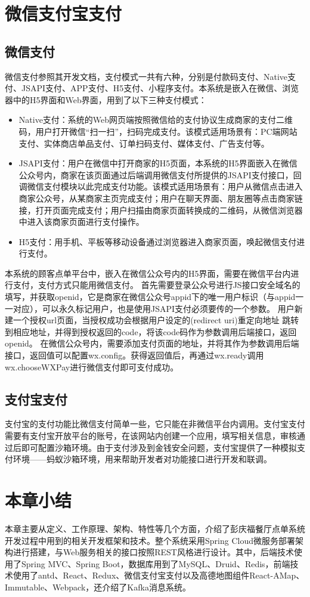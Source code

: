 \section{微信支付宝支付}
\subsection{微信支付}
微信支付参照其开发文档，支付模式一共有六种，分别是付款码支付、Native支付、JSAPI支付、APP支付、H5支付、小程序支付。本系统是嵌入在微信、浏览器中的H5界面和Web界面，用到了以下三种支付模式：
\begin{itemize}
    \item Native支付：系统的Web网页端按照微信给的支付协议生成商家的支付二维码，用户打开微信“扫一扫”，扫码完成支付。该模式适用场景有：PC端网站支付、实体商店单品支付、订单扫码支付、媒体支付、广告支付等。
    \item JSAPI支付：用户在微信中打开商家的H5页面，本系统的H5界面嵌入在微信公众号内，商家在该页面通过后端调用微信支付所提供的JSAPI支付接口，回调微信支付模块以此完成支付功能。该模式适用场景有：用户从微信点击进入商家公众号，从某商家主页完成支付；用户在聊天界面、朋友圈等点击商家链接，打开页面完成支付；用户扫描由商家页面转换成的二维码，从微信浏览器中进入该商家页面进行支付操作。
    \item 	H5支付：用手机、平板等移动设备通过浏览器进入商家页面，唤起微信支付进行支付。
\end{itemize}

本系统的顾客点单平台中，嵌入在微信公众号内的H5界面，需要在微信平台内进行支付，支付方式只能用微信支付。
首先需要登录公众号进行JS接口安全域名的填写，并获取openid，它是商家在微信公众号appid下的唯一用户标识（与appid一一对应），可以永久标记用户，也是使用JSAPI支付必须要传的一个参数。
用户新建一个授权url页面，当授权成功会根据用户设定的(redirect uri)重定向地址
跳转到相应地址，并得到授权返回的code，将该code码作为参数调用后端接口，返回openid。
在微信公众号内，需要添加支付页面的地址，并将其作为参数调用后端接口，返回值可以配置wx.config。获得返回值后，再通过wx.ready调用wx.chooseWXPay进行微信支付即可支付成功。\\

\subsection{支付宝支付}
支付宝的支付功能比微信支付简单一些，它只能在非微信平台内调用。支付宝支付需要有支付宝开放平台的账号，在该网站内创建一个应用，填写相关信息，审核通过后即可配置沙箱环境。由于支付涉及到金钱安全问题，支付宝提供了一种模拟支付环境——蚂蚁沙箱环境，用来帮助开发者对功能接口进行开发和联调。

\section{本章小结}
本章主要从定义、工作原理、架构、特性等几个方面，介绍了彭庆福餐厅点单系统开发过程中用到的相关开发框架和技术。整个系统采用Spring Cloud微服务部署架构进行搭建，与Web服务相关的接口按照REST风格进行设计。其中，后端技术使用了Spring MVC、Spring Boot，数据库用到了MySQL、Druid、Redis，前端技术使用了antd、React、Redux、微信支付宝支付以及高德地图组件React-AMap、Immutable、Webpack，还介绍了Kafka消息系统。
